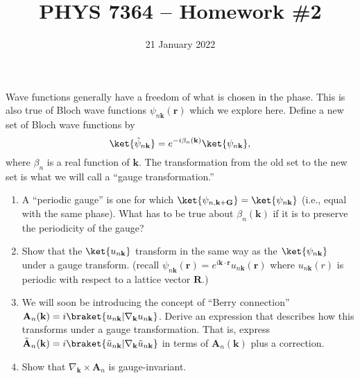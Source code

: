 \documentclass{jhwhw}
\author{}
\title{PHYS 7364 -- Homework \#2}
\date{21 January 2022}
\begin{document}

Wave functions generally have a freedom of what is chosen in the phase.
This is also true of Bloch wave functions $\psi_{n\mathbf k}(\mathbf r)$ which we explore here.
Define a new set of Bloch wave functions by
\begin{equation}
  \label{eq:1}
  \ket{\tilde \psi_{n\mathbf k}} = e^{-i\beta_{n}(\mathbf k)}\ket{\psi_{n\mathbf k}},
\end{equation}
where $\beta_{n}$ is a real function of $\mathbf k$. The transformation from the old set to the new set is what we will call a ``gauge transformation.''
\begin{enumerate}
  \item A ``periodic gauge'' is one for which $\ket{\psi_{n,\mathbf k+ \mathbf G}} = \ket{\psi_{n\mathbf k}}$ (i.e., equal with the same phase). What has to be true about $\beta_{n}(\mathbf k)$ if it is to preserve the periodicity of the gauge?
  \item Show that the $\ket{u_{n\mathbf k}}$ transform in the same way as the $\ket{\psi_{n\mathbf k}}$ under a gauge transform. (recall $\psi_{n\mathbf k}(\mathbf r) = e^{i \mathbf k\cdot \mathbf r} u_{n\mathbf k}(\mathbf r)$ where $u_{n\mathbf k}(r)$ is periodic with respect to a lattice vector $\mathbf R$.)
  \item We will soon be introducing the concept of ``Berry connection'' $\mathbf A_{n}(\mathbf k) = i \braket{u_{n\mathbf k} | \nabla_{\mathbf k} u_{n\mathbf k}}$. Derive an expression that describes how this transforms under a gauge transformation. That is, express $\tilde{\mathbf A}_{n}(\mathbf k) = i \braket{\tilde u_{n\mathbf k} | \nabla_{\mathbf k} \tilde u_{n\mathbf k}}$ in terms of $\mathbf A_{n}(\mathbf k)$ plus a correction.
  \item Show that $\nabla_{\mathbf k} \times \mathbf A_{n}$ is gauge-invariant.
\end{enumerate}

\end{document}
